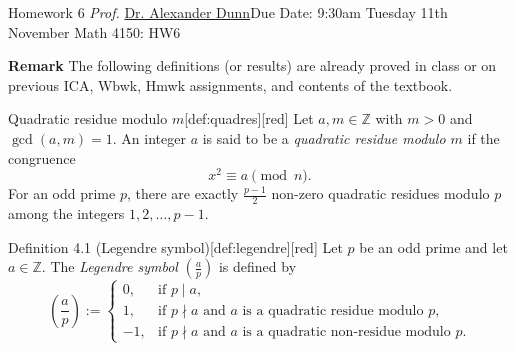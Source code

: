 \newpage{}
{Homework 6}
{\textit{Prof.} \href{https://alexjdunn.weebly.com/}{Dr. Alexander Dunn}}{Due Date: 9:30am Tuesday 11th November}
{Math 4150: HW6}










\newpage

\textbf{Remark} The following definitions (or results) are already proved in class or on previous ICA, Wbwk, Hmwk assignments, and contents of the textbook.


\begin{define}{Quadratic residue modulo $m$}[def:quadres][red]
Let $a,m\in\mathbb{Z}$ with $m>0$ and $\gcd(a,m)=1$. An integer $a$ is said to be a
\emph{quadratic residue modulo $m$} if the congruence
\[
x^2 \equiv a \pmod{n}.
\]
For an odd prime $p$, there are exactly $\frac{p-1}{2}$ non-zero quadratic residues modulo $p$ among the integers $1, 2, \ldots, p-1$.
\end{define}


\begin{define}{Definition 4.1 (Legendre symbol)}[def:legendre][red]
Let $p$ be an odd prime and let $a\in\mathbb{Z}$. The \emph{Legendre symbol} $(\tfrac{a}{p})$ is defined by
\[
\left(\frac{a}{p}\right):=
\begin{cases}
0, & \text{if } p\mid a,\\[4pt]
1, & \text{if } p\nmid a\text{ and } a \text{ is a quadratic residue modulo } p,\\[4pt]
-1,& \text{if } p\nmid a\text{ and } a \text{ is a quadratic non-residue modulo } p.
\end{cases}
\]
\end{define}




